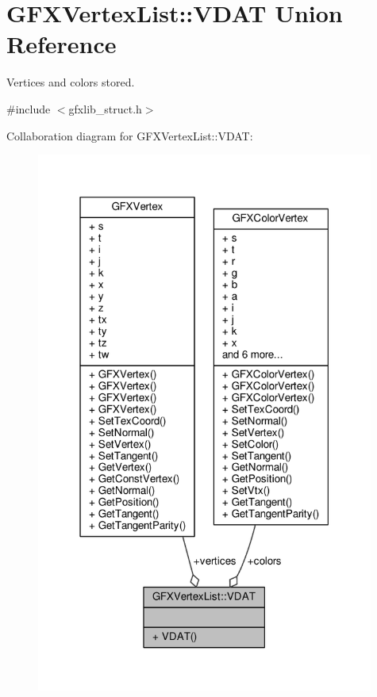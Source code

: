 \hypertarget{unionGFXVertexList_1_1VDAT}{}\section{G\+F\+X\+Vertex\+List\+:\+:V\+D\+AT Union Reference}
\label{unionGFXVertexList_1_1VDAT}


Vertices and colors stored.  




{\ttfamily \#include $<$gfxlib\+\_\+struct.\+h$>$}



Collaboration diagram for G\+F\+X\+Vertex\+List\+:\+:V\+D\+AT\+:
\nopagebreak
\begin{figure}[H]
\begin{center}
\leavevmode
\includegraphics[width=314pt]{d1/daf/unionGFXVertexList_1_1VDAT__coll__graph}
\end{center}
\end{figure}

